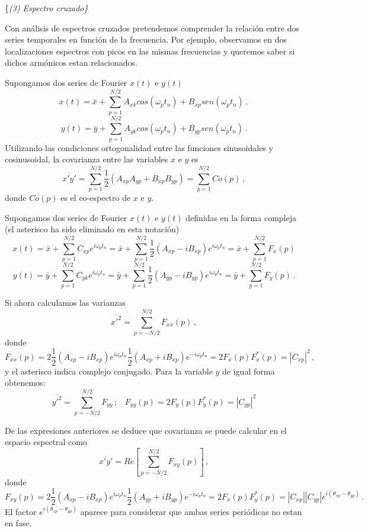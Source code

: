 \documentclass[
]{agujournal2019}
\begin{document}
\vspace{0.5cm}

\{\it \textbf \noindent (3) \noindent Espectro cruzado\}

Con análisis de espectros cruzados pretendemos comprender la relación
entre dos series temporales en función de la frecuencia. Por ejemplo,
observamos en dos localizaciones espectros con picos en las mismas
frecuencias y queremos saber si dichos armónicos estan relacionados.

Supongamos dos series de Fourier \(x(t)\) e \(y(t)\)
\[x(t)=\bar{x}+\sum\limits^{N/2}_{p=1} A_{xk} cos(\omega_p t_n) + B_{xp}sen(\omega_p t_n)\,,\]
\[y(t)=\bar{y}+\sum\limits^{N/2}_{p=1} A_{yk}cos(\omega_p t_n) + B_{yp}sen(\omega_p t_n)\,.\]
Utilizando las condiciones ortogonalidad entre las funciones
sinusoidales y cosinusoidal, la covarianza entre las variables \(x\) e
\(y\) es
\[\overline{x'y'}=\sum\limits^{N/2}_{p=1} \frac{1}{2}( A_{xp}A_{yp}  + B_{xp}B_{yp})=\sum\limits^{N/2}_{p=1}Co(p)\,,\]
donde \(Co(p)\) es el co-espectro de \(x\) e \(y\).

Supongamos dos series de Fourier \(x(t)\) e \(y(t)\) definidas en la
forma compleja (el asterisco ha sido eliminado en esta notación)
\[x(t)=\bar{x}+\sum\limits^{N/2}_{p=1}
  C_{xp} e^{i\omega_p t_n}=\bar{x}+
  \sum\limits^{N/2}_{p=1}\frac{1}{2}\left(A_{xp} - iB_{xp} \right)e^{i\omega_p t_n}=\bar{x}+
  \sum\limits^{N/2}_{p=1}F_x(p)\] \[y(t)=\bar{y}+\sum\limits^{N/2}_{p=1}
  C_{yk} e^{i\omega_p t_n}=\bar{y}+
  \sum\limits^{N/2}_{p=1}\frac{1}{2}\left(A_{yp} - iB_{yp} \right)e^{i\omega_p t_n}=\bar{y}+
  \sum\limits^{N/2}_{p=1}F_y(p)\,.\]

Si ahora calculamos las varianzas
\[\overline{x'^2}=\sum\limits^{N/2}_{p=-N/2}F_{xx}(p)\,,\] donde
\[F_{xx}(p)=2\frac{1}{2}\left(A_{xp} - iB_{xp} \right)e^{i\omega_p t_n}\frac{1}{2}\left(A_{xp} + iB_{xp} \right)e^{-i\omega_p t_n}
=2F_x(p) F^*_x(p)=|C_{xp}|^2\,,\] y el asterisco indica complejo
conjugado. Para la variable \(y\) de igual forma obtenemos:
\[\overline{y'^2}=\sum\limits^{N/2}_{p=-N/2}F_{yy}\,;\,\,\,\,\,F_{yy}(p)=2F_y(p) F^*_y(p)=|C_{yp}|^2\]

De las expresiones anteriores se deduce que covarianza se puede calcular
en el espacio espectral como
\[\overline{x'y'}=Re\left[\sum\limits^{N/2}_{p=-N/2}F_{xy}(p)\right]\,,\]
donde
\[F_{xy}(p)=2\frac{1}{2}\left(A_{xp} - iB_{xp} \right)e^{i\omega_p t_n}\frac{1}{2}\left(A_{yp} + iB_{yp} \right)e^{-i\omega_p t_n}
=2F_x(p) F^*_y(p)=|C_{xp}||C_{yp}|e^{i(\theta_{xp}-\theta_{yp})}\,.\] El
factor \(e^{i(\theta_{xp}-\theta_{yp})}\) aparece para considerar que
ambas series periódicas no estan en fase.
\end{document}
